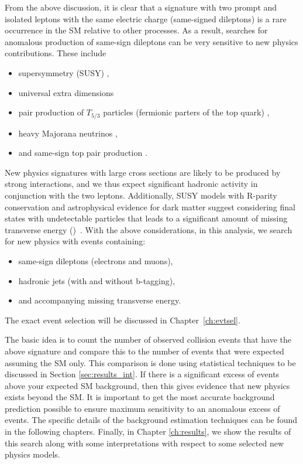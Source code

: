 From the above discussion, it is clear that a signature with two prompt and
isolated leptons with the same electric charge (same-signed dileptons) is a
rare occurrence in the SM relative to other processes. As a result, searches
for anomalous production of same-sign dileptons can be very sensitive to new
physics contributions. These include
\begin{itemize}
\item supersymmetry (SUSY) \cite{ss::barnett,ss:baer,ss:guchait},
\item universal extra dimensions \cite{ss:cheng}
\item pair production of $T_{5/3}$ particles (fermionic parters of the top quark) \cite{ss:contino}, 
\item heavy Majorana neutrinos \cite{ss:almeida},
\item and same-sign top pair production \cite{ss::sstop}.
\end{itemize}
New physics signatures with large cross sections are likely to be produced
by strong interactions, and we thus expect significant hadronic activity in
conjunction with the two leptons. Additionally, SUSY models with R-parity
conservation and astrophysical evidence for dark matter suggest considering
final states with undetectable particles that leads to a significant amount
of missing transverse energy (\met)~\cite{AMS,Bertone:2004pz}. With the above
considerations, in this analysis, we search for new physics with events
containing:
\begin{itemize}
\item same-sign dileptons (electrons and muons), 
\item hadronic jets (with and without b-tagging), 
\item and accompanying missing transverse energy.
\end{itemize}
The exact event selection will be discussed in Chapter~\ref{ch:evtsel}.

The basic idea is to count the number of observed collision events that have
the above signature and compare this to the number of events that were expected
assuming the SM only. This comparison is done using statistical techniques
to be discussed in Section \ref{sec:results_int}. If there is a significant
excess of events above your expected SM background, then this gives evidence
that new physics exists beyond the SM. It is important to get the most accurate
background prediction possible to ensure maximum sensitivity to an anomalous
excess of events. The specific details of the background estimation techniques
can be found in the following chapters. Finally, in Chapter \ref{ch:results},
we show the results of this search along with some interpretations with respect
to some selected new physics models.
